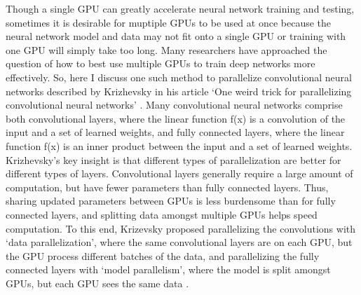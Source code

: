 \documentclass[11pt]{article}       %
\begin{document}
Though a single GPU can greatly accelerate neural network training and testing, sometimes it is desirable
for muptiple GPUs to be used at once because the neural network model and data may not fit onto a single GPU or training with one GPU will simply take too long. Many researchers have approached the question of how to best use multiple GPUs to train deep networks more effectively. So, here I discuss one such method to parallelize convolutional neural networks described by Krizhevsky in his article ‘One weird trick for parallelizing convolutional neural networks’ \cite{dr4}. Many convolutional neural networks comprise both convolutional layers, where the linear function f(x) is a convolution of the input and a set of
learned weights, and fully connected layers, where the linear function f(x) is an inner product between the input and a set of learned weights. Krizhevsky’s key insight is that different types of parallelization are better for different types of layers. Convolutional layers generally require a large amount of computation, but have fewer parameters than fully connected layers. Thus, sharing updated parameters between GPUs is less burdensome than for fully connected layers, and splitting data amongst multiple GPUs helps speed computation. To this end, Krizevsky proposed parallelizing the convolutions with ‘data parallelization’, where the same convolutional layers are on each GPU, but the GPU process different batches of the data, and parallelizing the fully connected layers with ‘model parallelism’, where the model is split amongst GPUs, but each GPU sees the same data \cite{dr4}.




\end{document}
